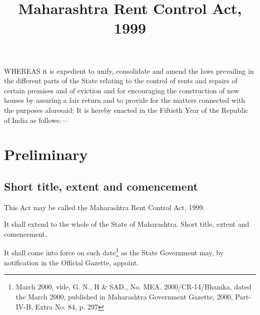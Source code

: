 \documentclass{mhact}
\begin{document}
\title{Maharashtra Rent Control Act, 1999}

\maketitle

\tableofcontents
{} 






WHEREAS it is expedient to unify, consolidate and amend the laws
prevailing in the different parts of the State relating to the control
of rents and repairs of certain premises and of eviction and for
encouraging the construction of new houses by assuring a fair return
and to provide for the matters connected with the purposes aforesaid;
It is hereby enacted in the Fiftieth Year of the Republic of India as
follows:---

\chapter{Preliminary}

\section{Short title, extent and comencement}

\begin{subsectionlist}
\item This Act may be called the Maharashtra Rent Control Act,
  1999.
\item It shall extend to the whole of the State of Maharashtra. Short title, extent and
comencement.
\item It shall come into force on such date\footnote{  March
    2000, vide, G. N., H \& SAD., No. MEA. 2000/CR-14/Bhanika, dated
    the  March 2000, published in Maharashtra Government
    Gazette, 2000, Part-IV-B, Extra No. 84, p. 297 } as the State
  Government may, by notification in the Official Gazette, appoint.
\end{subsectionlist}
\end{document}
